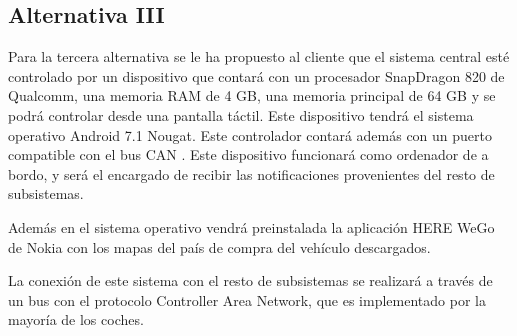 \subsection{Alternativa III}

\par Para la tercera alternativa se le ha propuesto al cliente que el sistema central esté controlado por un dispositivo que contará con un procesador SnapDragon 820 de Qualcomm, una memoria RAM de 4 GB, una memoria principal de 64 GB y se podrá controlar desde una pantalla táctil. Este dispositivo tendrá el sistema operativo Android 7.1 Nougat. Este controlador contará además con un puerto compatible con el bus CAN \cite{WEB:CocheOBD}. Este dispositivo funcionará como ordenador de a bordo, y será el encargado de recibir las notificaciones provenientes del resto de subsistemas.


Además en el sistema operativo vendrá preinstalada la aplicación HERE WeGo de Nokia con los mapas del país de compra del vehículo descargados.

La conexión de este sistema con el resto de subsistemas se realizará a través de un bus con el protocolo Controller Area Network, que es implementado por la mayoría de los coches.


